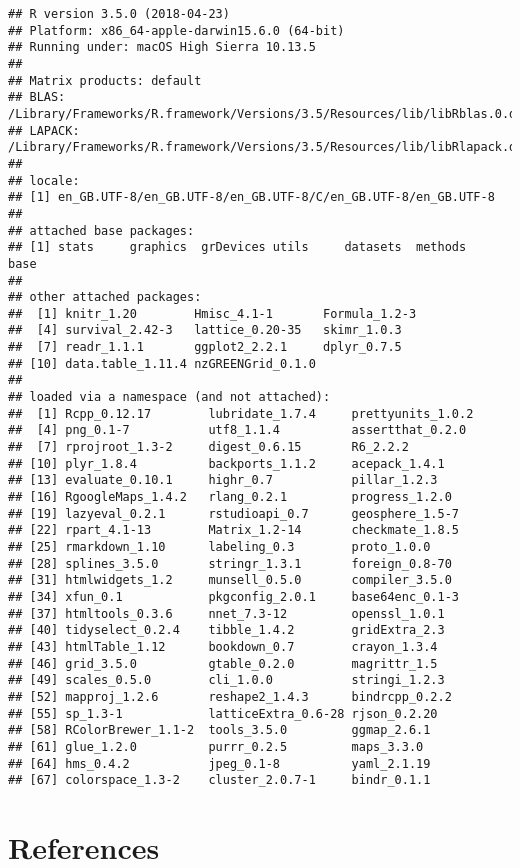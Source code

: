 \documentclass[]{article}
\theoremstyle{definition}
\theoremstyle{definition}
\theoremstyle{definition}
\theoremstyle{remark}
\begin{document}
\begin{verbatim}
## R version 3.5.0 (2018-04-23)
## Platform: x86_64-apple-darwin15.6.0 (64-bit)
## Running under: macOS High Sierra 10.13.5
## 
## Matrix products: default
## BLAS: /Library/Frameworks/R.framework/Versions/3.5/Resources/lib/libRblas.0.dylib
## LAPACK: /Library/Frameworks/R.framework/Versions/3.5/Resources/lib/libRlapack.dylib
## 
## locale:
## [1] en_GB.UTF-8/en_GB.UTF-8/en_GB.UTF-8/C/en_GB.UTF-8/en_GB.UTF-8
## 
## attached base packages:
## [1] stats     graphics  grDevices utils     datasets  methods   base     
## 
## other attached packages:
##  [1] knitr_1.20        Hmisc_4.1-1       Formula_1.2-3    
##  [4] survival_2.42-3   lattice_0.20-35   skimr_1.0.3      
##  [7] readr_1.1.1       ggplot2_2.2.1     dplyr_0.7.5      
## [10] data.table_1.11.4 nzGREENGrid_0.1.0
## 
## loaded via a namespace (and not attached):
##  [1] Rcpp_0.12.17        lubridate_1.7.4     prettyunits_1.0.2  
##  [4] png_0.1-7           utf8_1.1.4          assertthat_0.2.0   
##  [7] rprojroot_1.3-2     digest_0.6.15       R6_2.2.2           
## [10] plyr_1.8.4          backports_1.1.2     acepack_1.4.1      
## [13] evaluate_0.10.1     highr_0.7           pillar_1.2.3       
## [16] RgoogleMaps_1.4.2   rlang_0.2.1         progress_1.2.0     
## [19] lazyeval_0.2.1      rstudioapi_0.7      geosphere_1.5-7    
## [22] rpart_4.1-13        Matrix_1.2-14       checkmate_1.8.5    
## [25] rmarkdown_1.10      labeling_0.3        proto_1.0.0        
## [28] splines_3.5.0       stringr_1.3.1       foreign_0.8-70     
## [31] htmlwidgets_1.2     munsell_0.5.0       compiler_3.5.0     
## [34] xfun_0.1            pkgconfig_2.0.1     base64enc_0.1-3    
## [37] htmltools_0.3.6     nnet_7.3-12         openssl_1.0.1      
## [40] tidyselect_0.2.4    tibble_1.4.2        gridExtra_2.3      
## [43] htmlTable_1.12      bookdown_0.7        crayon_1.3.4       
## [46] grid_3.5.0          gtable_0.2.0        magrittr_1.5       
## [49] scales_0.5.0        cli_1.0.0           stringi_1.2.3      
## [52] mapproj_1.2.6       reshape2_1.4.3      bindrcpp_0.2.2     
## [55] sp_1.3-1            latticeExtra_0.6-28 rjson_0.2.20       
## [58] RColorBrewer_1.1-2  tools_3.5.0         ggmap_2.6.1        
## [61] glue_1.2.0          purrr_0.2.5         maps_3.3.0         
## [64] hms_0.4.2           jpeg_0.1-8          yaml_2.1.19        
## [67] colorspace_1.3-2    cluster_2.0.7-1     bindr_0.1.1
\end{verbatim}

\section*{References}\label{references}
\end{document}
